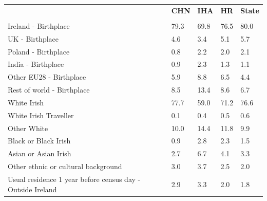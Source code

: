 \documentclass{article}
\begin{document}
\pagebreak
\begin{table}[h]	
\centering
		\begin{tabular}{KTTTT}
  \hline
& \textbf{CHN} & \textbf{IHA} & \textbf{HR}& \textbf{State}\\ 
  \hline
    \\ 
    \hline
Ireland - Birthplace & 79.3& 69.8& 76.5& 80.0\\
UK - Birthplace & 4.6& 3.4& 5.1& 5.7\\
Poland - Birthplace & 0.8& 2.2& 2.0& 2.1\\
India - Birthplace & 0.9& 2.3& 1.3& 1.1\\
Other EU28 - Birthplace & 5.9& 8.8& 6.5& 4.4\\
Rest of world - Birthplace &  8.5& 13.4&  8.6&  6.7\\
    \hline
White Irish & 77.7& 59.0& 71.2& 76.6\\
White Irish Traveller & 0.1& 0.4& 0.5& 0.6\\
Other White & 10.0& 14.4& 11.8&  9.9\\
Black or Black Irish & 0.9& 2.8& 2.3& 1.5\\
Asian or Asian Irish & 2.7& 6.7& 4.1& 3.3\\
Other ethnic or cultural background & 3.0& 3.7& 2.5& 2.0\\
    \hline
Usual residence 1 year before census day - Outside Ireland & 2.9& 3.3& 2.0& 1.8\\


\end{tabular}
\end{table}
\end{document}
